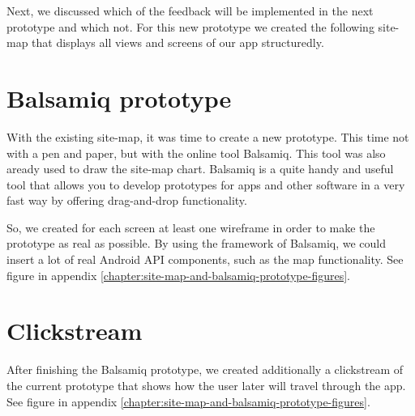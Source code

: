 \documentclass[11pt,twoside,a4paper]{report}
\begin{document}
Next, we discussed which of the feedback will be implemented in the next prototype and which not. For this new prototype we created the following site-map that displays all views and screens of our app structuredly.

\section{Balsamiq prototype}

With the existing site-map, it was time to create a new prototype. This time not with a pen and paper, but with the online tool Balsamiq. This tool was also aready used to draw the site-map chart. Balsamiq is a quite handy and useful tool that allows you to develop prototypes for apps and other software in a very fast way by oﬀering drag-and-drop functionality.

So, we created for each screen at least one wireframe in order to make the prototype as real as possible. By using the framework of Balsamiq, we could
insert a lot of real Android API components, such as the map functionality. See figure in appendix \ref{chapter:site-map-and-balsamiq-prototype-figures}.

\section{Clickstream}

After finishing the Balsamiq prototype, we created additionally a clickstream of the current prototype that shows how the user later will travel through the app. See figure in appendix \ref{chapter:site-map-and-balsamiq-prototype-figures}.
\end{document}
